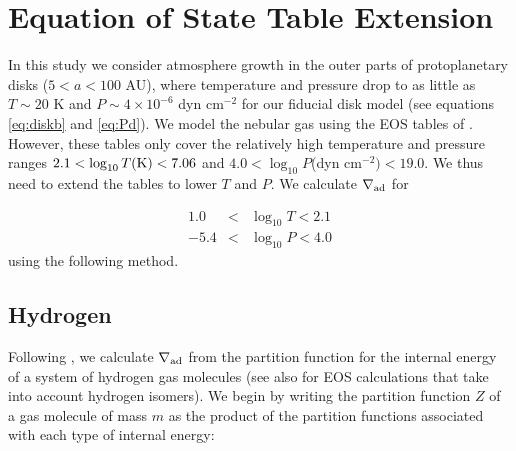 \chapter{Equation of State Table Extension}\label{EOStables}

In this study we consider atmosphere growth in the outer parts of protoplanetary disks ($5<a<100$ AU), where temperature and pressure drop to as little as $T \sim 20$ K and $P \sim4\times10^{-6}$ dyn cm$^{-2}$ for our fiducial disk model (see equations \ref{eq:diskb} and \ref{eq:Pd}). We model the nebular gas using the EOS tables of \citet{saumon95}. However, these tables only cover the relatively high temperature and pressure ranges $2.1 < \log_{10} T(\rm{K})<7.06$ and $4.0<\log_{10}P$(dyn cm$^{-2})<19.0$. We thus need to extend the tables to lower $T$ and $P$. We calculate $\nabla_{\rm ad}$ for

\begin{eqnarray}
1.0 & < & \log_{10} T <2.1 \\ 
-5.4& < & \log_{10} P<4.0 
\end{eqnarray} 
using the following method.





\section{Hydrogen}

\label{hydrogen}

Following \citet{kittel}, we calculate $\nabla_{\rm ad}$ from the partition function for the internal energy of a system of hydrogen gas molecules (see also \citealt{dangelo13} for EOS calculations that take into account hydrogen isomers).  We begin by writing the partition function $Z$ of a gas molecule of mass $m$ as the product of the partition functions associated with each type of internal energy:

